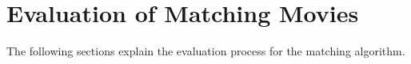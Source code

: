 \section{Evaluation of Matching Movies}
\label{sec_evaluation}

The following sections explain the evaluation process for the matching algorithm.


